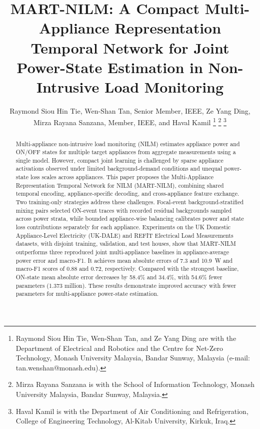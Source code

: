 \documentclass[journal]{IEEEtran}
\begin{document}
\raggedbottom

\title{MART-NILM: A Compact Multi-Appliance Representation Temporal Network for Joint Power-State Estimation in Non-Intrusive Load Monitoring}

\author{Raymond Siou Hin Tie, Wen-Shan Tan, Senior Member, IEEE, Ze Yang Ding,
Mirza Rayana Sanzana, Member, IEEE, and Haval Kamil%
\thanks{Raymond Siou Hin Tie, Wen-Shan Tan, and Ze Yang Ding are with the
Department of Electrical and Robotics and the Centre for Net-Zero Technology,
Monash University Malaysia, Bandar Sunway, Malaysia
(e-mail: tan.wenshan@monash.edu).}%
\thanks{Mirza Rayana Sanzana is with the School of Information Technology,
Monash University Malaysia, Bandar Sunway, Malaysia.}%
\thanks{Haval Kamil is with the Department of Air Conditioning and
Refrigeration, College of Engineering Technology, Al-Kitab University,
Kirkuk, Iraq.}}

\maketitle

\begin{abstract}
Multi-appliance non-intrusive load monitoring (NILM) estimates appliance power and ON/OFF states for multiple target appliances from aggregate measurements using a single model. However, compact joint learning is challenged by sparse appliance activations observed under limited background-demand conditions and unequal power-state loss scales across appliances. This paper proposes the Multi-Appliance Representation Temporal Network for NILM (MART-NILM), combining shared temporal encoding, appliance-specific decoding, and cross-appliance feature exchange. Two training-only strategies address these challenges. Focal-event background-stratified mixing pairs selected ON-event traces with recorded residual backgrounds sampled across power strata, while bounded appliance-wise balancing calibrates power and state loss contributions separately for each appliance. Experiments on the UK Domestic Appliance-Level Electricity (UK-DALE) and REFIT Electrical Load Measurements datasets, with disjoint training, validation, and test houses, show that MART-NILM outperforms three reproduced joint multi-appliance baselines in appliance-average power error and macro-F1. It achieves mean absolute errors of 7.3 and 10.9~W and macro-F1 scores of 0.88 and 0.72, respectively. Compared with the strongest baseline, ON-state mean absolute error decreases by 58.4\% and 34.4\%, with 54.6\% fewer parameters (1.373 million). These results demonstrate improved accuracy with fewer parameters for multi-appliance power-state estimation.
\end{abstract}
\end{document}
